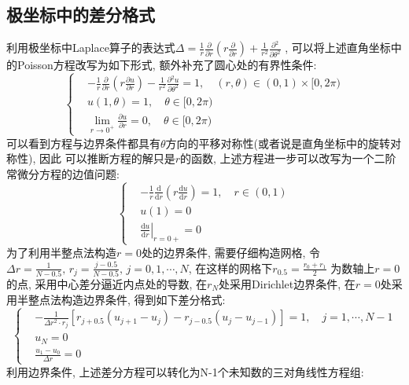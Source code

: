 \documentclass[a4paper,zihao=5,UTF8]{ctexart}
\def\d{\mathrm{d}}
\def\dps{\displaystyle}
\newcommand{\dv}[2]{\frac{\d{#1}}{\d{#2}}}
\newcommand{\pdv}[2]{\frac{\partial{#1}}{\partial{#2}}}
\begin{document}
	\subsection{极坐标中的差分格式}
	利用极坐标中Laplace算子的表达式$\dps\Delta = \frac{1}{r}\pdv{}{r}\left(r\pdv{}{r}\right) + \frac{1}{r^2}\pdv{^2}{\theta^2}$
	, 可以将上述直角坐标中的Poisson方程改写为如下形式, 额外补充了圆心处的有界性条件:
	\begin{equation}
		\left\{
			\begin{aligned}
				&-\frac{1}{r}\pdv{}{r}\left(r\pdv{u}{r}\right) - \frac{1}{r^2}\pdv{^2u}{\theta^2} = 1, \quad (r, \theta) \in (0, 1)\times[0, 2\pi)\\
				&u(1, \theta) = 1, \quad \theta \in [0, 2\pi)\\
				&\lim_{r \to 0^+} \pdv{u}{r} = 0, \quad \theta \in [0, 2\pi)
			\end{aligned}
		\right.
	\end{equation}
	可以看到方程与边界条件都具有$\theta$方向的平移对称性(或者说是直角坐标中的旋转对称性), 因此
	可以推断方程的解只是$r$的函数, 上述方程进一步可以改写为一个二阶常微分方程的边值问题:
	\begin{equation}
		\left\{
			\begin{aligned}
				&-\frac{1}{r}\dv{}{r}\left(r\dv{u}{r}\right) = 1, \quad r\in(0, 1)\\
				&u(1) = 0\\
				&\left.\dv{u}{r}\right|_{r = 0+} = 0
			\end{aligned}
		\right.
		\label{poisson r ode}
	\end{equation}
	为了利用半整点法构造$r=0$处的边界条件, 需要仔细构造网格, 令$\Delta r = \frac{1}{N-0.5},\,r_j = \frac{j - 0.5}{N - 0.5},\, j = 0, 1,\cdots, N$, 在这样的网格下$r_{0.5} = \frac{r_0 + r_1}{2}$
	为数轴上$r=0$的点, 采用中心差分逼近内点处的导数, 在$r_N$处采用Dirichlet边界条件, 
	在$r = 0$处采用半整点法构造边界条件, 
	得到如下差分格式:
	\begin{equation}
		\left\{
			\begin{aligned}
				& -\frac{1}{\Delta r^2\cdot r_j}\left[r_{j + 0.5}\left(u_{j+1} - u_j\right) - r_{j - 0.5}\left(u_j - u_{j - 1}\right)\right] = 1, \quad j = 1,\cdots, N-1\\
				&u_{N} = 0\\
				&\frac{u_1 - u_0}{\Delta r} = 0
			\end{aligned}
		\right.
	\end{equation}
	利用边界条件, 上述差分方程可以转化为N-1个未知数的三对角线性方程组:
\end{document}
